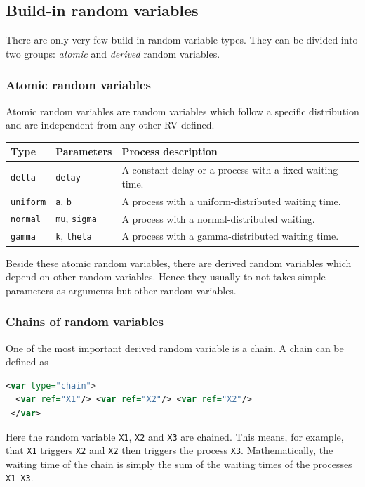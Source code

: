 \documentclass[a4paper, 10pt]{paper}
\newcommand{\code}[1]{\texttt{#1}}
\begin{document}
\subsection{Build-in random variables}
There are only very few build-in random variable types. They can be divided into two groups:
\emph{atomic} and \emph{derived} random variables.

\subsubsection{Atomic random variables}
Atomic random variables are random variables which follow a specific
distribution and are independent from any other RV defined.

\begin{tabular}{l|l|l}
 Type & Parameters & Process description \\ \hline
 \code{delta} & \code{delay} & A constant delay or a process with a fixed waiting time. \\
 \code{uniform} & \code{a}, \code{b} & A process with a uniform-distributed waiting time. \\
 \code{normal} & \code{mu}, \code{sigma} & A process with a normal-distributed waiting. \\
 \code{gamma} & \code{k}, \code{theta} & A process with a gamma-distributed waiting time.
\end{tabular}

Beside these atomic random variables, there are derived random variables which depend on other
random variables. Hence they usually to not takes simple parameters as arguments but other 
random variables.

\subsubsection{Chains of random variables}
One of the most important derived random variable is a chain. A chain can be defined as
\begin{lstlisting}[language=XML]
 <var type="chain">
  <var ref="X1"/> <var ref="X2"/> <var ref="X2"/>
 </var>
\end{lstlisting}

Here the random variable \code{X1}, \code{X2} and \code{X3} are chained. This means, for example,
that \code{X1} triggers \code{X2} and \code{X2} then triggers the process \code{X3}. Mathematically,
the waiting time of the chain is simply the sum of the waiting times of the processes \code{X1}--\code{X3}.
\end{document}
